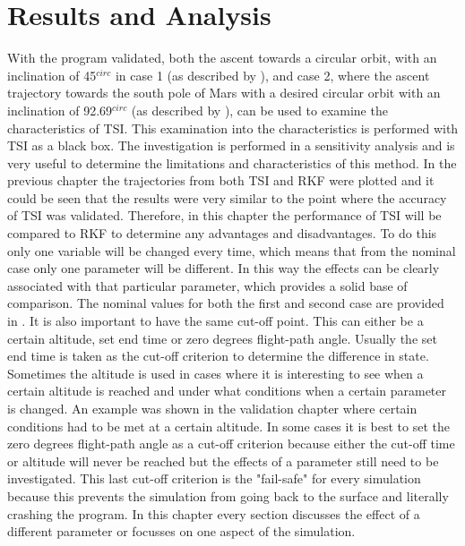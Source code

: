 \chapter{Results and Analysis} 
\label{ch:results}
With the program validated, both the ascent towards a circular orbit, with an inclination of 45$^{circ}$ in case 1 (as described by \cite{woolley2015simple}), and case 2, where the ascent trajectory towards the south pole of Mars with a desired circular orbit with an inclination of 92.69$^{circ}$ (as described by \cite{benito2016trajectory}), can be used to examine the characteristics of \ac{TSI}. This examination into the characteristics is performed with \ac{TSI} as a black box. The investigation is performed in a sensitivity analysis and is very useful to determine the limitations and characteristics of this method. In the previous chapter the trajectories from both \ac{TSI} and \ac{RKF} were plotted and it could be seen that the results were very similar to the point where the accuracy of \ac{TSI} was validated. Therefore, in this chapter the performance of \ac{TSI} will be compared to \ac{RKF} to determine any advantages and disadvantages. To do this only one variable will be changed every time, which means that from the nominal case only one parameter will be different. In this way the effects can be clearly associated with that particular parameter, which provides a solid base of comparison. The nominal values for both the first and second case are provided in . It is also important to have the same cut-off point. This can either be a certain altitude, set end time or zero degrees flight-path angle. Usually the set end time is taken as the cut-off criterion to determine the difference in state. Sometimes the altitude is used in cases where it is interesting to see when a certain altitude is reached and under what conditions when a certain parameter is changed. An example was shown in the validation chapter where certain conditions had to be met at a certain altitude. In some cases it is best to set the zero degrees flight-path angle as a cut-off criterion because either the cut-off time or altitude will never be reached but the effects of a parameter still need to be investigated. This last cut-off criterion is the "fail-safe" for every simulation because this prevents the simulation from going back to the surface and literally crashing the program. In this chapter every section discusses the effect of a different parameter or focusses on one aspect of the simulation. \\

